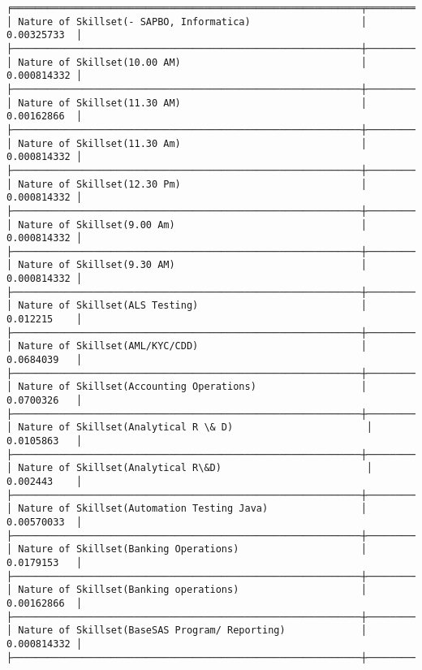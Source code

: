 \documentclass[11pt]{article}
\begin{document}
    \begin{Verbatim}[commandchars=\\\{\}]
╒════════════════════════════════════════════════════════════╤═════════════╕
│ Nature of Skillset(- SAPBO, Informatica)                   │ 0.00325733  │
├────────────────────────────────────────────────────────────┼─────────────┤
│ Nature of Skillset(10.00 AM)                               │ 0.000814332 │
├────────────────────────────────────────────────────────────┼─────────────┤
│ Nature of Skillset(11.30 AM)                               │ 0.00162866  │
├────────────────────────────────────────────────────────────┼─────────────┤
│ Nature of Skillset(11.30 Am)                               │ 0.000814332 │
├────────────────────────────────────────────────────────────┼─────────────┤
│ Nature of Skillset(12.30 Pm)                               │ 0.000814332 │
├────────────────────────────────────────────────────────────┼─────────────┤
│ Nature of Skillset(9.00 Am)                                │ 0.000814332 │
├────────────────────────────────────────────────────────────┼─────────────┤
│ Nature of Skillset(9.30 AM)                                │ 0.000814332 │
├────────────────────────────────────────────────────────────┼─────────────┤
│ Nature of Skillset(ALS Testing)                            │ 0.012215    │
├────────────────────────────────────────────────────────────┼─────────────┤
│ Nature of Skillset(AML/KYC/CDD)                            │ 0.0684039   │
├────────────────────────────────────────────────────────────┼─────────────┤
│ Nature of Skillset(Accounting Operations)                  │ 0.0700326   │
├────────────────────────────────────────────────────────────┼─────────────┤
│ Nature of Skillset(Analytical R \& D)                       │ 0.0105863   │
├────────────────────────────────────────────────────────────┼─────────────┤
│ Nature of Skillset(Analytical R\&D)                         │ 0.002443    │
├────────────────────────────────────────────────────────────┼─────────────┤
│ Nature of Skillset(Automation Testing Java)                │ 0.00570033  │
├────────────────────────────────────────────────────────────┼─────────────┤
│ Nature of Skillset(Banking Operations)                     │ 0.0179153   │
├────────────────────────────────────────────────────────────┼─────────────┤
│ Nature of Skillset(Banking operations)                     │ 0.00162866  │
├────────────────────────────────────────────────────────────┼─────────────┤
│ Nature of Skillset(BaseSAS Program/ Reporting)             │ 0.000814332 │
├────────────────────────────────────────────────────────────┼─────────────┤

\end{Verbatim}
\end{document}
